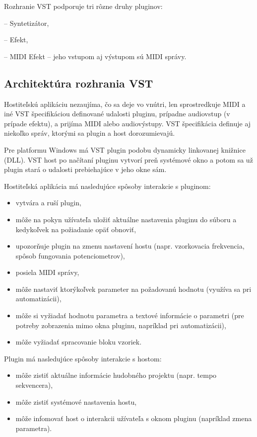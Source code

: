Rozhranie VST podporuje tri rôzne druhy pluginov:
\begin{description}
\setlength{\itemsep}{-0.5ex}
\item[VST Instrument] -- Syntetizátor,
\item[VST Effect] -- Efekt,
\item[VST MIDI effect] -- MIDI Efekt -- jeho vstupom aj výstupom sú MIDI správy. 
\end{description}

\subsection{Architektúra rozhrania VST}
Hostiteľskú aplikáciu nezaujíma, čo sa deje vo vnútri, len sprostredkuje MIDI a iné VST špecifikáciou definované udalosti pluginu, prípadne audiovstup (v prípade efek\-tu), a prijíma MIDI alebo audiovýstupy. VST špecifikácia definuje aj niekoľko správ, ktorými sa plugin a host dorozumievajú.

Pre platformu Windows má VST plugin podobu dynamicky linkovanej knižnice (DLL). VST host po načítaní pluginu vytvorí preň systémové okno a potom sa už plugin stará o udalosti prebiehajúce v jeho okne sám. 

Hostiteľská aplikácia má nasledujúce spôsoby interakcie s pluginom:

\begin{itemize}
\setlength{\itemsep}{-0.5ex}
\item vytvára a ruší plugin,
\item môže na pokyn užívateľa uložiť aktuálne nastavenia pluginu do súboru a kedykoľvek na požiadanie opäť obnoviť,
\item upozorňuje plugin na zmenu nastavení hostu (napr. vzorkovacia frekvencia, spôsob fungovania potenciometrov),
\item posiela MIDI správy,
\item môže nastaviť ktorýkoľvek parameter na požadovanú hodnotu (využíva sa pri automatizácii),
\item môže si vyžiadať hodnotu parametra a textové informácie o parametri (pre potreby zobrazenia mimo okna pluginu, napríklad pri automatizácii),
\item môže vyžiadať spracovanie bloku vzoriek.
\end{itemize}

Plugin má nasledujúce spôsoby interakcie s hostom:

\begin{itemize}
\setlength{\itemsep}{-0.5ex}
\item môže zistiť aktuálne informácie hudobného projektu (napr. tempo sekvencera),
\item môže zistiť systémové nastavenia hostu,
\item môže infomovať host o interakcii užívateľa s oknom pluginu (napríklad zmena parametra).
\end{itemize}

